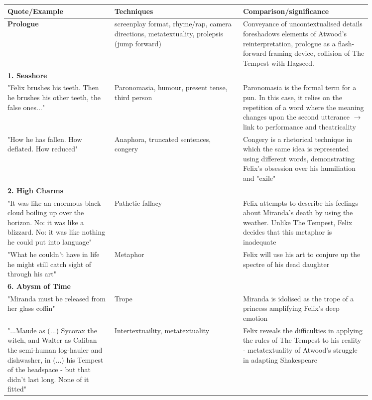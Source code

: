 		\begin{table}[htbp]
			\centering
			\begin{tabular}{ p{0.25\linewidth} | p{0.3\linewidth} | p{0.3\linewidth}}
				Quote/Example	& Techniques	& Comparison/significance \\ \hline
				\textbf{Prologue}	& screenplay format, rhyme/rap, camera directions, metatextuality, prolepsis (jump forward) & Conveyance of uncontextualised details foreshadows elements of Atwood's reinterpretation, prologue as a flash-forward framing device, collision of The Tempest with Hagseed. \\
				\textbf{1. Seashore}	&	&	\\
				"Felix brushes his teeth. Then he brushes his other teeth, the false ones..."	& Paronomasia, humour, present tense, third person	& Paronomasia is the formal term for a pun. In this case, it relies on the repetition of a word where the meaning changes upon the second utterance $\rightarrow$ link to performance and theatricality \\
				"How he has fallen. How deflated. How reduced"	& Anaphora, truncated sentences, congery	& Congery is a rhetorical technique in which the same idea is represented using different words, demonstrating Felix's obsession over his humiliation and "exile"	\\
				\textbf{2. High Charms}	&	&	\\
				"It was like an enormous black cloud boiling up over the horizon. No: it was like a blizzard. No: it was like nothing he could put into language" & Pathetic fallacy	& Felix attempts to describe his feelings about Miranda's death by using the weather. Unlike The Tempest, Felix decides that this metaphor is inadequate \\
				"What he couldn't have in life he might still catch sight of through his art" & Metaphor	& Felix will use his art to conjure up the spectre of his dead daughter \\
				\textbf{6. Abysm of Time} &	&	\\
				"Miranda must be released from her glass coffin"	& Trope	& Miranda is idolised as the trope of a princess amplifying Felix's deep emotion \\
				"...Maude as (...) Sycorax the witch, and Walter as Caliban the semi-human log-hauler and dishwasher, in (...) his Tempest of the headspace - but that didn't last long. None of it fitted" & Intertextuaility, metatextuality & Felix reveals the difficulties in applying the rules of The Tempest to his reality - metatextuality of Atwood's struggle in adapting Shakespeare \\

\end{tabular}
\end{table}
